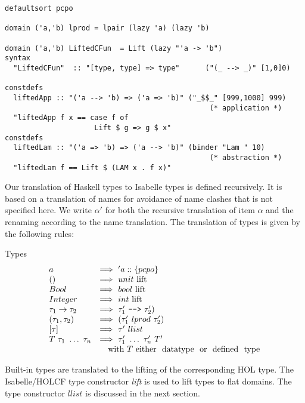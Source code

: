 \documentclass{llncs}
\begin{document}
\begin{verbatim} 
defaultsort pcpo

domain ('a,'b) lprod = lpair (lazy 'a) (lazy 'b)

domain ('a,'b) LiftedCFun  = Lift (lazy "'a -> 'b")  
syntax 
  "LiftedCFun"  :: "[type, type] => type"      ("(_ --> _)" [1,0]0)

constdefs
  liftedApp :: "('a --> 'b) => ('a => 'b)" ("_$$_" [999,1000] 999)
                                                (* application *)
  "liftedApp f x == case f of
                     Lift $ g => g $ x"
constdefs
  liftedLam :: "('a => 'b) => ('a --> 'b)" (binder "Lam " 10)
                                                (* abstraction *)
  "liftedLam f == Lift $ (LAM x . f x)"
\end{verbatim}

Our translation of Haskell types to Isabelle types is defined
recursively.  It is based on a translation of names for avoidance of
name clashes that is not specified here. We write $\alpha'$ for both
the recursive translation of item $\alpha$ and the renaming according
to the name translation.  The translation of types is given by the
following rules:


\noindent Types
$$\begin{array}{ll}
  a & \Longrightarrow \ 'a::\{pcpo\} \\
  () & \Longrightarrow \ unit \ \mbox{lift} \\
  Bool & \Longrightarrow \ bool \ \mbox{lift} \\
  Integer & \Longrightarrow \ int \ \mbox{lift} \\
  \tau_{1} \to \tau_{2} & \Longrightarrow
  \ \tau'_{1} \ \verb@-->@ \ \tau'_{2})  \\
  (\tau_{1},\tau_{2}) & \Longrightarrow
  \ (\tau'_{1} ~lprod~ \tau'_{2}) \\
  {[\tau]} \ & \Longrightarrow \ \tau' \ llist \\
  T \ \tau_1 \ \ldots \ \tau_n & \Longrightarrow
  \ \tau'_1 \ \ldots \ \tau'_n \ T' \\
  & \quad \mbox{with} \ T \ \mbox{either \ datatype \ or \ defined \ type} \\
\end{array}$$

Built-in types are translated to the lifting of the corresponding HOL type.
The Isabelle/HOLCF type constructor \emph{lift} is used to lift types to flat
domains. The type constructor $llist$ is discussed in the next section.
\end{document}
